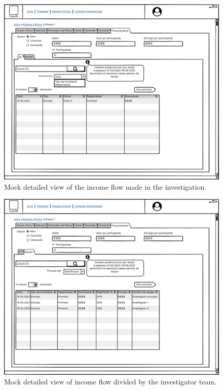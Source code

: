 \begin{figure}[H]
    \centering
    \includegraphics[scale=0.35]{images/ensaio-finance-ec.png}
    \caption{Mock detailed view of the income flow made in the investigation.}
    \label{fig:ensaio-finance-ec}
\end{figure}

\begin{figure}[H]
    \centering
    \includegraphics[scale=0.35]{images/ensaio-finance-team.png}
    \caption{Mock detailed view of income flow divided by the investigator team.}
    \label{fig:ensaio-finance-team}
\end{figure}

